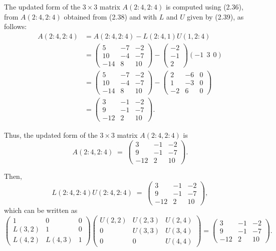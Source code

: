 \begin{examplex}
The updated form of the $3\times 3$ matrix $A(2:4,2:4)$ is computed using
(2.36), from $A(2:4,2:4)$ obtained from (2.38) and with $L$ and $U$ given by
(2.39), as follows:
\begin{align*}
A(2:4,2:4) &= A(2:4,2:4) - L(2:4,1)U(1,2:4) \\
&= \begin{pmatrix} 5 & -7 & -2 \\ 10 & -4 & -7 \\ -14 & 8 & 10 \end{pmatrix} - \begin{pmatrix} -2 \\ -1 \\ 2 \end{pmatrix}(-1\ \ 3\ \ 0) \\
&= \begin{pmatrix} 5 & -7 & -2 \\ 10 & -4 & -7 \\ -14 & 8 & 10 \end{pmatrix} - \begin{pmatrix} 2 & -6 & 0 \\ 1 & -3 & 0 \\ -2 & 6 & 0 \end{pmatrix} \\
&= \begin{pmatrix} 3 & -1 & -2 \\ 9 & -1 & -7 \\ -12 & 2 & 10 \end{pmatrix}.
\end{align*}

Thus, the updated form of the $3\times 3$ matrix $A(2:4,2:4)$ is
\begin{equation}
A(2:4,2:4) \;=\; \begin{pmatrix} 3 & -1 & -2 \\ 9 & -1 & -7 \\ -12 & 2 & 10 \end{pmatrix}.
\end{equation}

Then,
\[
L(2:4,2:4)U(2:4,2:4) \;=\; \begin{pmatrix} 3 & -1 & -2 \\ 9 & -1 & -7 \\ -12 & 2 & 10 \end{pmatrix},
\]
which can be written as
\[
\begin{pmatrix} 1 & 0 & 0 \\ L(3,2) & 1 & 0 \\ L(4,2) & L(4,3) & 1 \end{pmatrix}
\begin{pmatrix} U(2,2) & U(2,3) & U(2,4) \\ 0 & U(3,3) & U(3,4) \\ 0 & 0 & U(4,4) \end{pmatrix}
=
\begin{pmatrix} 3 & -1 & -2 \\ 9 & -1 & -7 \\ -12 & 2 & 10 \end{pmatrix}.
\]


\end{examplex}
